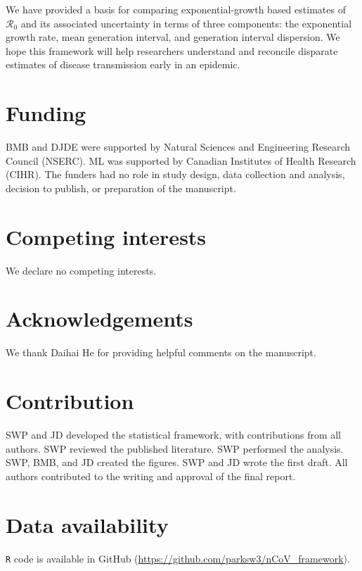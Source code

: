 \documentclass[12pt]{article}
\newcommand{\Ro}{\ensuremath{{\mathcal R}_{0}}\xspace}
\begin{document}
We have provided a basis for comparing exponential-growth based estimates of \Ro and its associated uncertainty in terms of three components: the exponential growth rate, mean generation interval, and generation interval dispersion. 
We hope this framework will help researchers understand and reconcile disparate estimates of disease transmission early in an epidemic.

\pagebreak

\section*{Funding}

BMB and DJDE were supported by Natural Sciences and Engineering Research Council (NSERC). ML was supported by Canadian Institutes of Health Research (CIHR). The funders had no role in study design, data collection and analysis, decision to publish, or preparation of the manuscript.

\section*{Competing interests}

We declare no competing interests.

\section*{Acknowledgements}

We thank Daihai He for providing helpful comments on the manuscript.

\section*{Contribution}

SWP and JD developed the statistical framework, with contributions from all authors. 
SWP reviewed the published literature.
SWP performed the analysis.
SWP, BMB, and JD created the figures. 
SWP and JD wrote the first draft.
All authors contributed to the writing and approval of the final report.

\section*{Data availability}

\texttt{R} code is available in GitHub (\url{https://github.com/parksw3/nCoV_framework}).

\pagebreak
\end{document}
